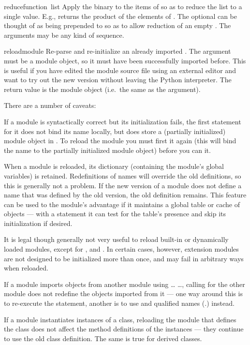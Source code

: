 \begin{funcdesc}{reduce}{function\, list}
Apply the binary  to the items of  so as to
reduce the list to a single value.  E.g.,
 returns the product of
the elements of .  The optional  can be
thought of as being prepended to  so as to allow reduction
of an empty .  The  arguments may be any kind of
sequence.
\end{funcdesc}

\begin{funcdesc}{reload}{module}
Re-parse and re-initialize an already imported .  The
argument must be a module object, so it must have been successfully
imported before.  This is useful if you have edited the module source
file using an external editor and want to try out the new version
without leaving the Python interpreter.  The return value is the
module object (i.e.\ the same as the  argument).

There are a number of caveats:

If a module is syntactically correct but its initialization fails, the
first  statement for it does not bind its name locally,
but does store a (partially initialized) module object in
.  To reload the module you must first
 it again (this will bind the name to the partially
initialized module object) before you can  it.

When a module is reloaded, its dictionary (containing the module's
global variables) is retained.  Redefinitions of names will override
the old definitions, so this is generally not a problem.  If the new
version of a module does not define a name that was defined by the old
version, the old definition remains.  This feature can be used to the
module's advantage if it maintains a global table or cache of objects
--- with a  statement it can test for the table's presence
and skip its initialization if desired.

It is legal though generally not very useful to reload built-in or
dynamically loaded modules, except for ,  and
.  In certain cases, however, extension modules are
not designed to be initialized more than once, and may fail in
arbitrary ways when reloaded.

If a module imports objects from another module using 
\ldots{}  \ldots{}, calling  for the other
module does not redefine the objects imported from it --- one way
around this is to re-execute the  statement, another is to
use  and qualified names (.)
instead.

If a module instantiates instances of a class, reloading the module
that defines the class does not affect the method definitions of the
instances --- they continue to use the old class definition.  The same
is true for derived classes.
\end{funcdesc}

